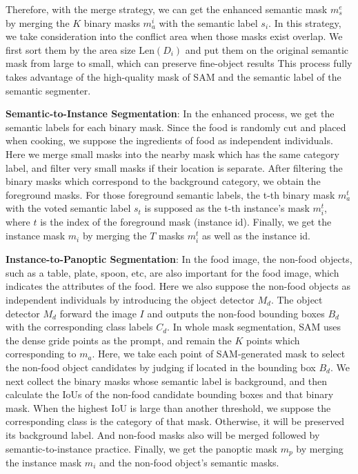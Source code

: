 \documentclass[lettersize,journal]{IEEEtran}
\begin{document}
Therefore, with the merge strategy, we can get the enhanced semantic mask $m_s^e$ by merging the $K$ binary masks $m_a^i$ with the semantic label $s_i$.
In this strategy,  we take consideration into the conflict area when those masks exist overlap. 
We first sort them by the area size $\text{Len}(D_i)$ and put them on the original semantic mask from large to small, which can preserve fine-object results
This process fully takes advantage of the high-quality mask of SAM and the semantic label of the semantic segmenter.

\textbf{Semantic-to-Instance Segmentation}: 
In the enhanced process, we get the semantic labels for each binary mask. 
Since the food is randomly cut and placed when cooking, we suppose the ingredients of food as independent individuals. 
Here we merge small masks into the nearby mask which has the same category label, and filter very small masks if their location is separate. 
After filtering the binary masks which correspond to the background category, we obtain the foreground masks. 
For those foreground semantic labels, the t-th binary mask $m_a^t$ with the voted semantic label $s_t$ is supposed as the t-th instance's mask $m_i^t$, where $t$ is the index of the foreground mask (instance id). 
Finally, we get the instance mask $m_i$ by merging the $T$ masks $m_i^t$ as well as the instance id.

\textbf{Instance-to-Panoptic Segmentation}: In the food image, the non-food objects, such as a table, plate, spoon, etc, are also important for the food image, 
which indicates the attributes of the food. 
Here we also suppose the non-food objects as independent individuals by introducing the object detector $M_d$.
The object detector $M_d$ forward the image $I$ and outputs the non-food bounding boxes $B_d$ with the corresponding class labels $C_d$.
In whole mask segmentation, SAM uses the dense gride points as the prompt, and remain the $K$ points which corresponding to $m_a$.
Here, we take each point of SAM-generated mask to select the non-food object candidates by judging if located in the bounding box $B_d$.
We next collect the binary masks whose semantic label is background, and then calculate the IoUs of the non-food candidate bounding boxes and that binary mask. 
When the highest IoU is large than another threshold, we suppose the corresponding class is the category of that mask. 
Otherwise, it will be preserved its background label. 
And non-food masks also will be merged followed by semantic-to-instance practice. 
Finally, we get the panoptic mask $m_p$ by merging the instance mask $m_i$ and the non-food object's semantic masks.
\end{document}
